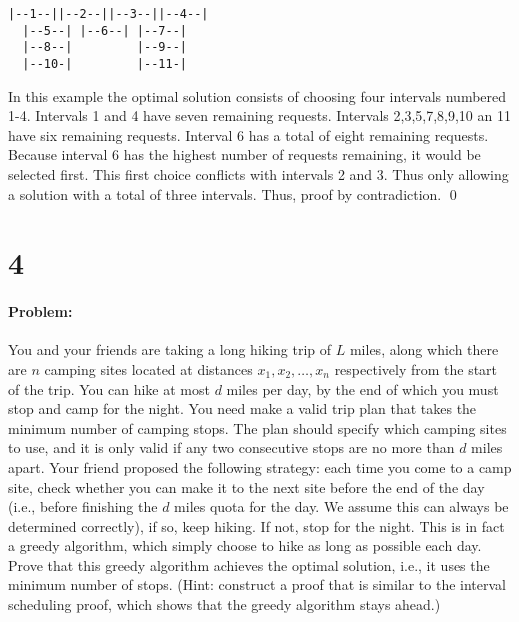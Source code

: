 \documentclass[12pt]{article}
\begin{document}
\begin{verbatim}
|--1--||--2--||--3--||--4--|
  |--5--| |--6--| |--7--|
  |--8--|         |--9--|
  |--10-|         |--11-|
\end{verbatim}

In this example the optimal solution consists of choosing four intervals
numbered 1-4.  Intervals 1 and 4 have seven remaining requests.
Intervals 2,3,5,7,8,9,10 an 11 have six remaining requests.  Interval 6
has a total of eight remaining requests.  Because interval 6 has the
highest number of requests remaining, it would be selected first.  This
first choice conflicts with intervals 2 and 3.  Thus only allowing a
solution with a total of three intervals.  Thus, proof by contradiction.
\qed

\section*{4}
\paragraph{Problem:}
You and your friends are taking a long hiking trip of $L$ miles, along
which there are $n$ camping sites located at distances $x_1, x_2, \dots,
x_n$
respectively from the start of the trip. You can hike at most $d$ miles
per day, by the end of which you must stop and camp for the night. You
need make a valid trip plan that takes the minimum number of camping
stops. The plan should specify which camping sites to use, and it is
only valid if any two consecutive stops are no more than $d$ miles apart.
Your friend proposed the following strategy: each time you come to a
camp site, check whether you can make it to the next site before the end
of the day (i.e., before finishing the $d$ miles quota for the day. We
assume this can always be determined correctly), if so, keep hiking. If
not, stop for the night.  This is in fact a greedy algorithm, which
simply choose to hike as long as possible each day. Prove that this
greedy algorithm achieves the optimal solution, i.e., it uses the minimum
number of stops. (Hint: construct a proof that is similar to the
interval scheduling proof, which shows that the greedy algorithm stays
ahead.)
\end{document}
